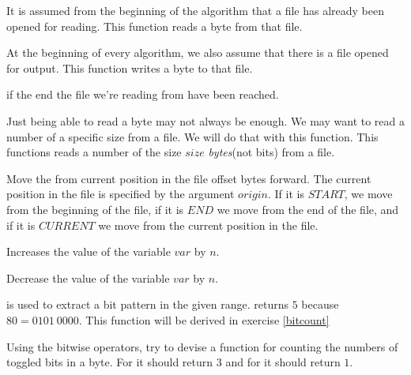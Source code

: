 \begin{description}[font=\normalfont]
\item[\textproc{ReadByte}] It is assumed from the beginning of the
  algorithm that a file has already been opened for reading. This
  function reads a byte from that file.

\item[\Call{WriteByte}{$byte$}] At the beginning of every algorithm,
  we also assume that there is a file opened for output. This function
  writes a byte to that file.

\item[\textproc{EndOfFileReached}] \True{} if the end the file we're
  reading from have been reached.

\item[\Call{Read}{$size$}] Just being able to read a byte may not
  always be enough. We may want to read a number of a specific size
  from a file. We will do that with this function. This functions
  reads a number of the size $size$ \textit{bytes}(not bits) from a
  file.

\item[\Call{Seek}{$offset,origin$}] Move the from current position in
  the file offset bytes forward. The current position in the file is
  specified by the argument $origin$. If it is $START$, we move from the
  beginning of the file, if it is $END$ we move from the end of the
  file, and if it is $CURRENT$ we move from the current position in
  the file.

\item[\Call{Inc}{\ensuremath{var,n}}] Increases the value of the
  variable $var$ by $n$.

\item[\Call{Dec}{\ensuremath{var,n}}] Decrease the value of the
  variable $var$ by $n$.


\item[\Call{getbits}{$b, start, end$}] is used to extract a bit
  pattern in the given range.  returns
  $5$ because $80 = 0101\ 0000$. This function will be derived in
  exercise \ref{bitcount}

\end{description}

\begin{Exercise}[label={bitcount}]
  Using the bitwise operators, try to devise a function
   for counting the numbers of toggled bits in a
  byte. For  it should return $3$ and for
   it should return $1$.

\end{Exercise}

